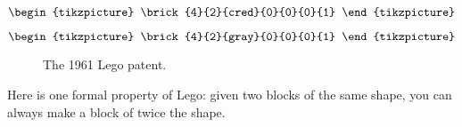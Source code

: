 {\begin{forslides}
\begin{equation}\label{eq:lego-red3}
\begin{tikzpicture}
  \brick{4}{2}{cred}{0}{0}{0}{1} %
\end{tikzpicture}
\end{equation}


\begin{equation}\label{eq:lego-gray3}
\begin{tikzpicture}
  \brick{4}{2}{gray}{0}{0}{0}{1} %
\end{tikzpicture}
\end{equation}
\end{forslides}
}%
{}

\begin{figure*}[p]
  \centering
%
  \caption{The 1961 Lego patent.}
\end{figure*}
Here is one formal property of Lego: given two blocks of the same shape, you can always make a block of twice the shape.

